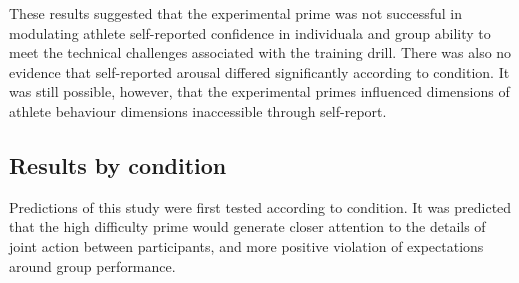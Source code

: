 \documentclass[english]{article}\usepackage[]{graphicx}\usepackage[]{color}
\begin{document}
These results suggested that the experimental prime was not successful in modulating athlete self-reported confidence in individuala and group ability to meet the technical challenges associated with the training drill. There was also no evidence that self-reported arousal differed significantly according to condition.  It was still possible, however, that the experimental primes influenced dimensions of athlete behaviour dimensions inaccessible through self-report.


\subsection{Results by condition}
Predictions of this study were first tested according to condition. It was predicted that the high difficulty prime would generate closer attention to the details of joint action between participants, and more positive violation of expectations around group performance.




\end{document}
